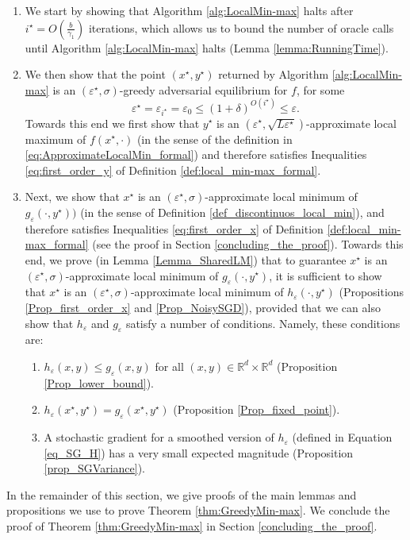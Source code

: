 \documentclass[11pt,letterpaper]{article}
\renewcommand{\epsilon}{\varepsilon}
\newcommand{\eps}{\varepsilon}
\begin{document}
\begin{enumerate}
    \item We start by showing that Algorithm \ref{alg:LocalMin-max} halts after $i^\star = O\left(\frac{b}{\gamma_1}\right)$ iterations, which allows us to bound the number of oracle calls until Algorithm \ref{alg:LocalMin-max} halts (Lemma \ref{lemma:RunningTime}).

\item We then show that the point $(x^\star, y^\star)$ returned by Algorithm \ref{alg:LocalMin-max} is an $(\epsilon^\star, \sigma)$-greedy adversarial equilibrium for $f$, for some 
%
\begin{equation*}
\epsilon^\star = \epsilon_{i^\star} = \epsilon_0 \leq  (1+\delta)^{O(i^\star)} \leq \epsilon.
\end{equation*}
%
Towards this end we first show that $y^\star$ is an $(\epsilon^\star, \sqrt{L \epsilon^\star})$-approximate local maximum of $f(x^\star, \cdot)$ (in the sense of the definition in \eqref{eq:ApproximateLocalMin_formal}) and therefore satisfies Inequalities \eqref{eq:first_order_y} of Definition \ref{def:local_min-max_formal}.

\item Next, we show that $x^\star$ is an $(\eps^\star, \sigma)$-approximate local minimum of  $g_\epsilon(\cdot, y^\star))$ (in the sense of Definition \ref{def_discontinuos_local_min}), and therefore satisfies Inequalities \eqref{eq:first_order_x} of Definition \ref{def:local_min-max_formal} (see the proof in Section \ref{concluding_the_proof}).
%
Towards this end, we prove (in Lemma \ref{Lemma_SharedLM}) that to guarantee  $x^\star$ is an $(\eps^\star, \sigma)$-approximate local minimum of  $g_\epsilon(\cdot, y^\star)$, it is sufficient to show that $x^\star$ is an $(\eps^\star, \sigma)$-approximate local minimum of  $h_\epsilon(\cdot, y^\star)$ (Propositions \ref{Prop_first_order_x} and \ref{Prop_NoisySGD}), provided that we can also show that $h_\eps$ and $g_\eps$ satisfy a number of conditions.
%
Namely, these conditions are:
\begin{enumerate}
    \item $h_\epsilon(x,y) \leq g_\epsilon(x,y)$ for all $(x,y) \in \mathbb{R}^d \times \mathbb{R}^d$ (Proposition \ref{Prop_lower_bound}).
    \item $h_\epsilon(x^\star,y^\star) = g_\epsilon(x^\star,y^\star)$ (Proposition \ref{Prop_fixed_point}).
    \item A stochastic gradient for a smoothed version of $h_\eps$  (defined in Equation \eqref{eq_SG_H}) has a very small expected magnitude (Proposition \ref{prop_SGVariance}).
    
    
    \end{enumerate}
    \end{enumerate}
\noindent    
    In the remainder of this section, we give proofs of the main lemmas and propositions we use to prove Theorem \ref{thm:GreedyMin-max}.  We conclude the proof of Theorem \ref{thm:GreedyMin-max} in Section \ref{concluding_the_proof}.
    
\end{document}
